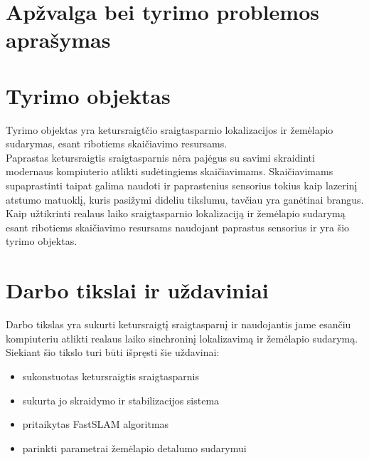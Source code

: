 \documentclass[a4paper, 12pt]{article} %
\begin{document}
\begin{onehalfspacing}

\section*{Ap\v{z}valga bei tyrimo problemos apra\v{s}ymas}

\section{Tyrimo objektas}

Tyrimo objektas yra ketursraigt\v{c}io sraigtasparnio lokalizacijos ir \v{z}em\.elapio sudarymas, esant ribotiems skai\v{c}iavimo resursams.
\\
\indent Paprastas ketursraigtis sraigtasparnis n\.era paj\.egus su savimi skraidinti modernaus kompiuterio atlikti sud\.etingiems skai\v{c}iavimams. Skai\v{c}iavimams supaprastinti taipat galima naudoti ir paprastenius sensorius tokius kaip lazerin\k{i} atstumo matuokl\k{i}, kuris pasi\v{z}ymi dideliu tikslumu, tav\v{c}iau yra gan\.{e}tinai brangus. Kaip u\v{z}tikrinti  realaus laiko sraigtasparnio lokalizacij\k{a} ir \v{z}em\.elapio sudarym\k{a} esant ribotiems skai\v{c}iavimo resursams naudojant paprastus sensorius ir yra \v{s}io tyrimo objektas. 

\section{Darbo tikslai ir u\v{z}daviniai}
Darbo tikslas yra sukurti ketursraigt\k{i} sraigtasparn\k{i} ir naudojantis jame esan\v{c}iu kompiuteriu atlikti realaus laiko sinchronin\k{i} lokalizavim\k{a} ir \v{z}em\.elapio sudarym\k{a}.
\\
\indent Siekiant \v{s}io tikslo turi b\=uti i\v{s}pr\k{e}sti \v{s}ie u\v{z}davinai:
\begin{itemize}
\item sukonstuotas ketursraigtis sraigtasparnis
\item sukurta jo skraidymo ir stabilizacijos sistema
\item pritaikytas FastSLAM algoritmas\cite{Zikos2011}
\item parinkti parametrai \v{z}em\.elapio detalumo sudarymui
\end{itemize}
     
  

\end{onehalfspacing}
\end{document}
